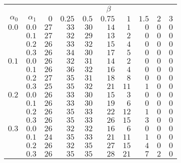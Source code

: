 \begin{tabular}{rr|rrrrrrrr}
\hline\hline
 && \multicolumn{8}{c}{$\beta$}\\
 $\alpha_0$ & $\alpha_1$ & $0$ & $0.25$ & $0.5$ & $0.75$ & $1$ & $1.5$ & $2$ & $3$ \\ 
 \hline
$0.0$ & $0.0$ & $27$ & $33$ & $30$ & $14$ & $1$ & $0$ & $0$ & $0$\\ 
 & $0.1$ & $27$ & $32$ & $29$ & $13$ & $2$ & $0$ & $0$ & $0$\\ 
 & $0.2$ & $26$ & $33$ & $32$ & $15$ & $4$ & $0$ & $0$ & $0$\\ 
 & $0.3$ & $26$ & $34$ & $30$ & $17$ & $5$ & $0$ & $0$ & $0$\\ 
\hline 
 $0.1$ & $0.0$ & $26$ & $32$ & $31$ & $14$ & $2$ & $0$ & $0$ & $0$\\ 
 & $0.1$ & $26$ & $36$ & $32$ & $16$ & $4$ & $0$ & $0$ & $0$\\ 
 & $0.2$ & $27$ & $35$ & $31$ & $18$ & $8$ & $0$ & $0$ & $0$\\ 
 & $0.3$ & $25$ & $35$ & $32$ & $21$ & $11$ & $1$ & $0$ & $0$\\ 
\hline 
 $0.2$ & $0.0$ & $26$ & $33$ & $30$ & $15$ & $3$ & $0$ & $0$ & $0$\\ 
 & $0.1$ & $26$ & $33$ & $30$ & $19$ & $6$ & $0$ & $0$ & $0$\\ 
 & $0.2$ & $26$ & $35$ & $33$ & $22$ & $12$ & $1$ & $0$ & $0$\\ 
 & $0.3$ & $26$ & $35$ & $33$ & $26$ & $15$ & $3$ & $0$ & $0$\\ 
\hline 
 $0.3$ & $0.0$ & $26$ & $32$ & $32$ & $16$ & $6$ & $0$ & $0$ & $0$\\ 
 & $0.1$ & $24$ & $35$ & $33$ & $21$ & $11$ & $1$ & $0$ & $0$\\ 
 & $0.2$ & $26$ & $32$ & $35$ & $27$ & $15$ & $4$ & $0$ & $0$\\ 
 & $0.3$ & $26$ & $35$ & $35$ & $28$ & $21$ & $7$ & $2$ & $0$\\ 
 \hline 
 \end{tabular}